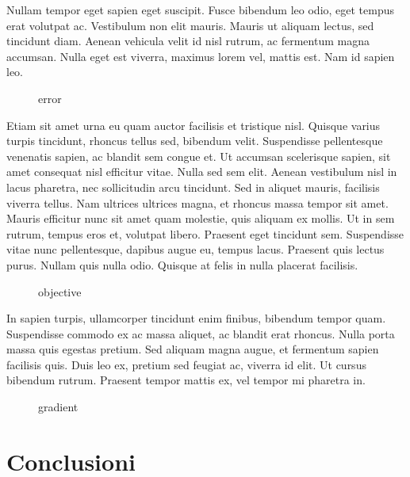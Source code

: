 \documentclass[a4paper]{article}
\begin{document}
Nullam tempor eget sapien eget suscipit. Fusce bibendum leo odio, eget tempus erat volutpat ac. Vestibulum non elit mauris. Mauris ut aliquam lectus, sed tincidunt diam. Aenean vehicula velit id nisl rutrum, ac fermentum magna accumsan. Nulla eget est viverra, maximus lorem vel, mattis est. Nam id sapien leo.
\begin{figure}
    \begin{center}
        \scalebox{0.65}{}
    \end{center}
    \caption{error}
\end{figure}
Etiam sit amet urna eu quam auctor facilisis et tristique nisl. Quisque varius turpis tincidunt, rhoncus tellus sed, bibendum velit. Suspendisse pellentesque venenatis sapien, ac blandit sem congue et. Ut accumsan scelerisque sapien, sit amet consequat nisl efficitur vitae. Nulla sed sem elit. Aenean vestibulum nisl in lacus pharetra, nec sollicitudin arcu tincidunt. Sed in aliquet mauris, facilisis viverra tellus. Nam ultrices ultrices magna, et rhoncus massa tempor sit amet. Mauris efficitur nunc sit amet quam molestie, quis aliquam ex mollis. Ut in sem rutrum, tempus eros et, volutpat libero. Praesent eget tincidunt sem. Suspendisse vitae nunc pellentesque, dapibus augue eu, tempus lacus. Praesent quis lectus purus. Nullam quis nulla odio. Quisque at felis in nulla placerat facilisis.
\begin{figure}
    \begin{center}
        \scalebox{0.65}{}
    \end{center}
    \caption{objective}
\end{figure}
In sapien turpis, ullamcorper tincidunt enim finibus, bibendum tempor quam. Suspendisse commodo ex ac massa aliquet, ac blandit erat rhoncus. Nulla porta massa quis egestas pretium. Sed aliquam magna augue, et fermentum sapien facilisis quis. Duis leo ex, pretium sed feugiat ac, viverra id elit. Ut cursus bibendum rutrum. Praesent tempor mattis ex, vel tempor mi pharetra in.
\begin{figure}
    \begin{center}
        \scalebox{0.65}{}
    \end{center}
    \caption{gradient}
\end{figure}

\section{Conclusioni}
\end{document}
